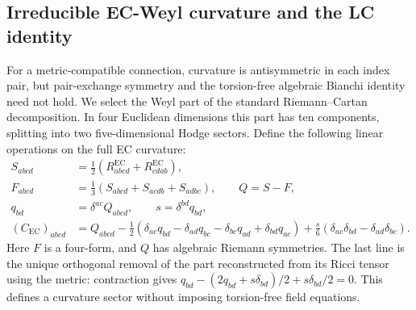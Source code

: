\subsection{Irreducible EC-Weyl curvature and the LC identity}
\label{sec:ecweyl}
For a metric-compatible connection, curvature is antisymmetric in each
index pair, but pair-exchange symmetry and the torsion-free algebraic
Bianchi identity need not hold. We select the Weyl part of the standard
Riemann--Cartan decomposition.\cite{McNutt2024} In four Euclidean dimensions
this part has ten components, splitting into two five-dimensional Hodge
sectors. Define the following linear operations on the full EC curvature:
\begin{equation}
\begin{aligned}
S_{abcd}&=\tfrac12(R^{\mathrm{EC}}_{abcd}+R^{\mathrm{EC}}_{cdab}),\\
F_{abcd}&=\tfrac13(S_{abcd}+S_{acdb}+S_{adbc}),\qquad Q=S-F,\\
q_{bd}&=\delta^{ac}Q_{abcd},\qquad s=\delta^{bd}q_{bd},\\
(C_{\mathrm{EC}})_{abcd}&=Q_{abcd}-\tfrac12(\delta_{ac}q_{bd}-\delta_{ad}q_{bc}
-\delta_{bc}q_{ad}+\delta_{bd}q_{ac})
+\tfrac{s}{6}(\delta_{ac}\delta_{bd}-\delta_{ad}\delta_{bc}).
\end{aligned}\tag{WP}\label{eq:WP}
\end{equation}
Here $F$ is a four-form, and $Q$ has algebraic Riemann symmetries. The last
line is the unique orthogonal removal of the part reconstructed from its
Ricci tensor using the metric: contraction gives
$q_{bd}-(2q_{bd}+s\delta_{bd})/2+s\delta_{bd}/2=0$.
This defines a curvature sector without imposing torsion-free field equations.


